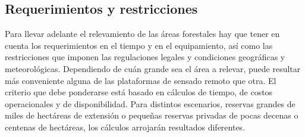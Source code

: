 \subsection{Requerimientos y restricciones} \label{Metodo calculo relevamiento}
Para llevar adelante el relevamiento de las áreas forestales hay que tener en cuenta los requerimientos en el tiempo y en el equipamiento, así como las restricciones que imponen las regulaciones legales y condiciones geográficas y meteorológicas. Dependiendo de cuán grande sea el área a relevar, puede resultar más conveniente alguna de las plataformas de sensado remoto que otra. El criterio que debe ponderarse está basado en cálculos de tiempo, de costos operacionales y de disponibilidad. Para distintos escenarios, reservas grandes de miles de hectáreas de extensión o pequeñas reservas privadas de pocas decenas o centenas de hectáreas, los cálculos arrojarán resultados diferentes.

